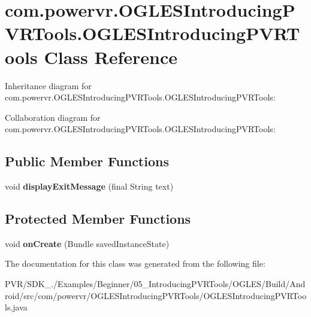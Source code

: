 \hypertarget{classcom_1_1powervr_1_1_o_g_l_e_s_introducing_p_v_r_tools_1_1_o_g_l_e_s_introducing_p_v_r_tools}{\section{com.\+powervr.\+O\+G\+L\+E\+S\+Introducing\+P\+V\+R\+Tools.\+O\+G\+L\+E\+S\+Introducing\+P\+V\+R\+Tools Class Reference}
\label{classcom_1_1powervr_1_1_o_g_l_e_s_introducing_p_v_r_tools_1_1_o_g_l_e_s_introducing_p_v_r_tools}
}


Inheritance diagram for com.\+powervr.\+O\+G\+L\+E\+S\+Introducing\+P\+V\+R\+Tools.\+O\+G\+L\+E\+S\+Introducing\+P\+V\+R\+Tools\+:


Collaboration diagram for com.\+powervr.\+O\+G\+L\+E\+S\+Introducing\+P\+V\+R\+Tools.\+O\+G\+L\+E\+S\+Introducing\+P\+V\+R\+Tools\+:
\subsection*{Public Member Functions}
\begin{DoxyCompactItemize}
\item 
\hypertarget{classcom_1_1powervr_1_1_o_g_l_e_s_introducing_p_v_r_tools_1_1_o_g_l_e_s_introducing_p_v_r_tools_a44afe8fccd4e4cdcacecf958f2493830}{void {\bfseries display\+Exit\+Message} (final String text)}\label{classcom_1_1powervr_1_1_o_g_l_e_s_introducing_p_v_r_tools_1_1_o_g_l_e_s_introducing_p_v_r_tools_a44afe8fccd4e4cdcacecf958f2493830}

\end{DoxyCompactItemize}
\subsection*{Protected Member Functions}
\begin{DoxyCompactItemize}
\item 
\hypertarget{classcom_1_1powervr_1_1_o_g_l_e_s_introducing_p_v_r_tools_1_1_o_g_l_e_s_introducing_p_v_r_tools_a528b24341ef9bcd174b93a1de0e59ff1}{void {\bfseries on\+Create} (Bundle saved\+Instance\+State)}\label{classcom_1_1powervr_1_1_o_g_l_e_s_introducing_p_v_r_tools_1_1_o_g_l_e_s_introducing_p_v_r_tools_a528b24341ef9bcd174b93a1de0e59ff1}

\end{DoxyCompactItemize}


The documentation for this class was generated from the following file\+:\begin{DoxyCompactItemize}
\item 
P\+V\+R/\+S\+D\+K\+\_./\+Examples/\+Beginner/05\+\_\+\+Introducing\+P\+V\+R\+Tools/\+O\+G\+L\+E\+S/\+Build/\+Android/src/com/powervr/\+O\+G\+L\+E\+S\+Introducing\+P\+V\+R\+Tools/O\+G\+L\+E\+S\+Introducing\+P\+V\+R\+Tools.\+java\end{DoxyCompactItemize}
